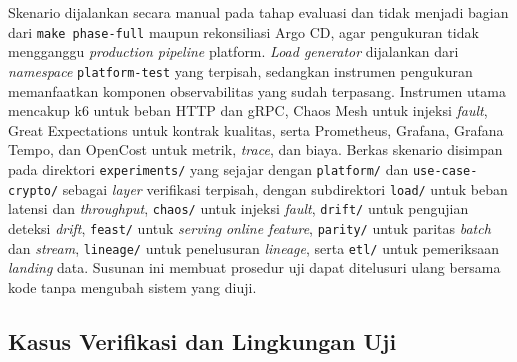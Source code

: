Skenario dijalankan secara manual pada tahap evaluasi dan tidak menjadi bagian dari \texttt{make phase-full} maupun rekonsiliasi Argo CD, agar pengukuran tidak mengganggu \textit{production pipeline} platform. \textit{Load generator} dijalankan dari \textit{namespace} \texttt{platform-test} yang terpisah, sedangkan instrumen pengukuran memanfaatkan komponen observabilitas yang sudah terpasang. Instrumen utama mencakup k6 untuk beban HTTP dan gRPC, Chaos Mesh untuk injeksi \textit{fault}, Great Expectations untuk kontrak kualitas, serta Prometheus, Grafana, Grafana Tempo, dan OpenCost untuk metrik, \textit{trace}, dan biaya. Berkas skenario disimpan pada direktori \texttt{experiments/} yang sejajar dengan \texttt{platform/} dan \texttt{use-case-crypto/} sebagai \textit{layer} verifikasi terpisah, dengan subdirektori \texttt{load/} untuk beban latensi dan \textit{throughput}, \texttt{chaos/} untuk injeksi \textit{fault}, \texttt{drift/} untuk pengujian deteksi \textit{drift}, \texttt{feast/} untuk \textit{serving} \textit{online feature}, \texttt{parity/} untuk paritas \textit{batch} dan \textit{stream}, \texttt{lineage/} untuk penelusuran \textit{lineage}, serta \texttt{etl/} untuk pemeriksaan \textit{landing} data. Susunan ini membuat prosedur uji dapat ditelusuri ulang bersama kode tanpa mengubah sistem yang diuji.

\subsection{Kasus Verifikasi dan Lingkungan Uji}
\label{subsec:instans-verifikasi}

